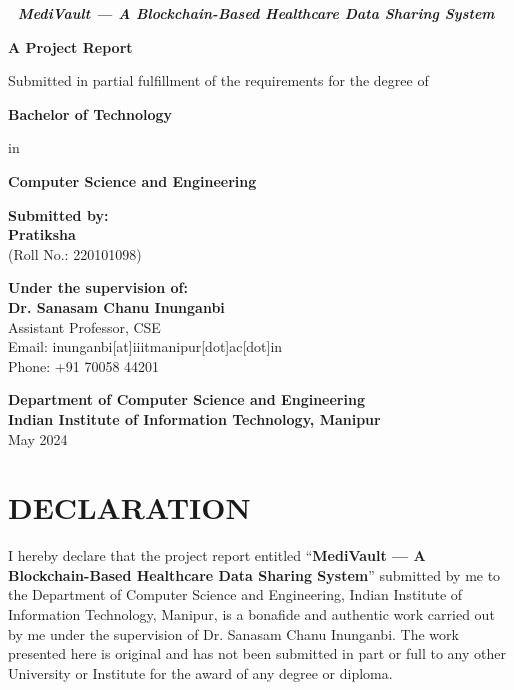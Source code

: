 \documentclass[12pt, a4paper]{report}
\begin{document}
\begin{titlepage}
    \centering
    \vspace*{1cm}
    {\Huge \bfseries \textit{🌿 MediVault — A Blockchain-Based Healthcare Data Sharing System}}

    \vspace{1.5cm}

    {\Large \bfseries A Project Report}

    \vspace{1cm}

    {\large Submitted in partial fulfillment of the requirements for the degree of}

    \vspace{0.5cm}

    {\Large \bfseries Bachelor of Technology}

    \vspace{0.5cm}

    {\large in}

    \vspace{0.5cm}

    {\Large \bfseries Computer Science and Engineering}

    \vfill

    {\large \bfseries Submitted by:} \\
    {\Large \bfseries Pratiksha} \\
    {\large (Roll No.: 220101098)}

    \vspace{1.5cm}

    {\large \bfseries Under the supervision of:} \\
    {\Large \bfseries Dr. Sanasam Chanu Inunganbi} \\
    {\large Assistant Professor, CSE} \\
    {\large Email: inunganbi[at]iiitmanipur[dot]ac[dot]in} \\
    {\large Phone: +91 70058 44201}

    \vspace{2cm}

    {\large \bfseries Department of Computer Science and Engineering} \\
    {\large \bfseries Indian Institute of Information Technology, Manipur} \\
    {\large May 2024}

\end{titlepage}

\chapter*{DECLARATION}
I hereby declare that the project report entitled “\textbf{MediVault — A Blockchain-Based Healthcare Data Sharing System}” submitted by me to the Department of Computer Science and Engineering, Indian Institute of Information Technology, Manipur, is a bonafide and authentic work carried out by me under the supervision of Dr. Sanasam Chanu Inunganbi. The work presented here is original and has not been submitted in part or full to any other University or Institute for the award of any degree or diploma.
\end{document}

